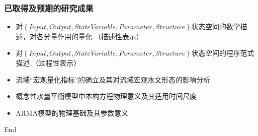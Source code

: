 \documentclass{beamer}
\begin{document}
\begin{CJK}{UTF8}{gkai}
\begin{frame}
\frametitle{已取得及预期的研究成果}
\begin{itemize}
\item 对$\left\{{Input,Output,State Variable,Parameter, Structure}\right\}$状态空间的数学描述，对各分量作用的量化.（描述性表示）
\item 对$\left\{{Input,Output,State Variable,Parameter, Structure}\right\}$状态空间的程序范式描述.（过程性表示）
\item 流域“宏观量化指标”的确立及其对流域宏观水文形态的影响分析
\item 概念性水量平衡模型中本构方程物理意义及其适用时间尺度
\item ARMA模型的物理基础及其参数意义
\end{itemize}
\end{frame}

\begin{frame}
\centering \LARGE End
\end{frame}

\end{CJK}
\end{document}
